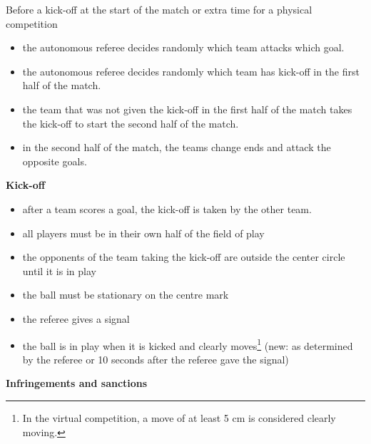 Before a kick-off at the start of the match or extra time for a physical competition
\begin{itemize}
    \item the autonomous referee decides randomly which team attacks which goal.
    \item the autonomous referee decides randomly which team has kick-off in the first half of the match.
    \item the team that was not given the kick-off in the first half of the match takes the kick-off to start the second half of the match.
    \item in the second half of the match, the teams change ends and attack the opposite goals.
\end{itemize}


\bigskip

{\bfseries Kick-off}

\begin{itemize}
\item after a team scores a goal, the kick-off is taken by the other team. 
\item all players must be in their own half of the field of play 
\item the opponents of the team taking the kick-off are outside the center
      circle until it is in play
\item the ball must be stationary on the centre mark
\item the referee gives a signal
\item the ball is in play when it is kicked and clearly moves\footnote{In the virtual competition, a move of at least 5 cm is considered clearly moving.}
      (new: as determined by the referee or 10 seconds after the referee gave the signal)
\end{itemize}

{\bfseries Infringements and sanctions}

\headlinebox


